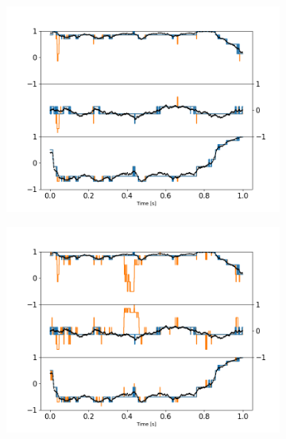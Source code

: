 \documentclass[preprint,  3p]{elsarticle}
\begin{document}
\begin{figure}[h]
	\centering
	\begin{subfigure}{0.32\textwidth}
		\subcaption{}
		\includegraphics[width=\textwidth]{./Images/fig11a.png}
	\end{subfigure}
	\begin{subfigure}{0.32\textwidth}
		\subcaption{}
		\includegraphics[width=\textwidth]{./Images/fig11b.png}
	\end{subfigure}
	\begin{subfigure}{0.32\textwidth}
		\subcaption{}

\end{subfigure}
\end{figure}
\end{document}
